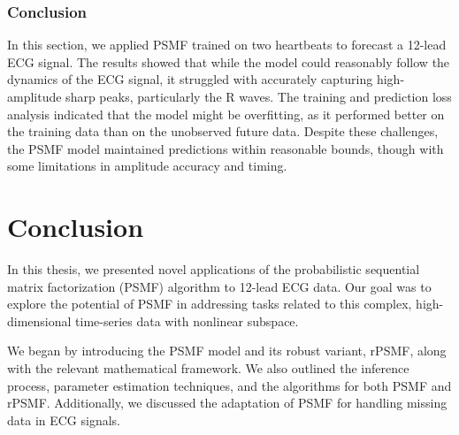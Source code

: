 \documentclass{mldsmsc}
\begin{document}
\subsection{Conclusion}

\noindent In this section, we applied PSMF trained on two heartbeats to forecast a 12-lead ECG signal. The results showed that while the model could reasonably follow the dynamics of the ECG signal, it struggled with accurately capturing high-amplitude sharp peaks, particularly the R waves. The training and prediction loss analysis indicated that the model might be overfitting, as it performed better on the training data than on the unobserved future data. Despite these challenges, the PSMF model maintained predictions within reasonable bounds, though with some limitations in amplitude accuracy and timing.

\chapter{Conclusion}

In this thesis, we presented novel applications of the probabilistic sequential matrix factorization (PSMF) algorithm to 12-lead ECG data. Our goal was to explore the potential of PSMF in addressing tasks related to this complex, high-dimensional time-series data with nonlinear subspace. \newline

\noindent We began by introducing the PSMF model and its robust variant, rPSMF, along with the relevant mathematical framework. We also outlined the inference process, parameter estimation techniques, and the algorithms for both PSMF and rPSMF. Additionally, we discussed the adaptation of PSMF for handling missing data in ECG signals. \newline
\end{document}
